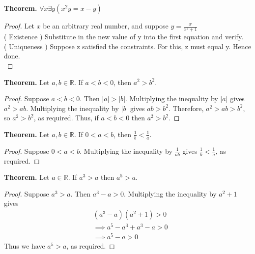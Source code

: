 \documentclass[12pt,letterpaper]{exam}
\newenvironment{theorem}
{\textbf{Theorem.}}{\par}
\newcommand{\abs}[1]{\lvert #1 \rvert}
\begin{document}
\begin{questions}
    
    \setcounter{question}{0}

    \question
    \begin{theorem}
        $\forall x \exists y \left( x^2 y = x-y \right)$
    \end{theorem}
    \begin{proof}
        Let $x$ be an arbitrary real number, and suppose $y = \frac{x}{x^2 +1}$\\
        \left( Existence \right) Substitute in the new value of y into the first equation and verify. \\
        \left( Uniqueness \right) Suppose z satisfied the constraints. For this, z must equal y. Hence done. \\
    \end{proof}

    \question
    \begin{theorem}
        Let $a, b \in \mathbb{R}$. If $a < b < 0$, then $a^2 > b^2$.
    \end{theorem}
    \begin{proof}
        Suppose $a < b < 0$. Then $\abs a > \abs b$. 
        Multiplying the inequality by $\abs a$ gives $a^2 > ab$.
        Multiplying the inequality by $\abs b$ gives $ab > b^2$.
        Therefore, $a^2 > ab > b^2$, so $a^2 > b^2$, as required.
        Thus, if $a < b < 0$ then $a^2 > b^2$.
    \end{proof}

    \question
    \begin{theorem}
        Let $a, b \in \mathbb{R}$. If $0 < a < b$, then $\frac{1}{b} < \frac{1}{a}$.
    \end{theorem}
    \begin{proof}
        Suppose $0 < a < b$. 
        Multiplying the inequality by $\frac{1}{ab}$ gives $\frac{1}{b} < \frac{1}{a}$, as required.
    \end{proof}

    \question
    \begin{theorem}
        Let $a \in \mathbb{R}$. If $a^3 > a$ then $a^5 > a$.
    \end{theorem}
    \begin{proof}
        Suppose $a^3 > a$. Then $a^3 - a > 0$. 
        Multiplying the inequality by $a^2 + 1$ gives
        \begin{align*}
            & (a^3 - a)(a^2 + 1) > 0 \\
            & \implies a^5 - a^3 + a^3 - a > 0 \\
            & \implies a^5 - a > 0
        \end{align*}
        Thus we have $a^5 > a$, as required.
    \end{proof}


\end{questions}
\end{document}

